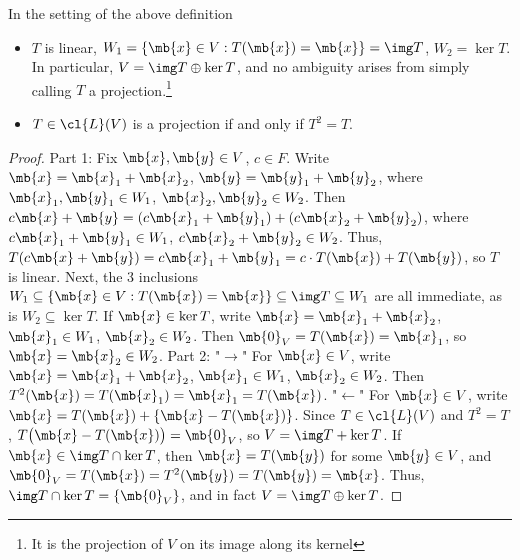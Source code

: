 \begin{exer}\label{e:projection}
In the setting of the above definition
\begin{itemize}
\item $T$ is linear, $W_1= \{ \mb{x}\in V:T( \mb{x})= \mb{x}\} = \img T$, $W_2= \ker T$. In particular, $V= \img T \oplus \ker T$, and no ambiguity arises from simply calling $T$ a projection.\footnote{It is the projection of $V$ on its image along its kernel}
\item $T \in \cl{L}(V)$ is a projection if and only if $T^2=T$.
\end{itemize}
\end{exer}
\begin{proof}%
Part 1: Fix $\mb{x}, \mb{y}\in V$, $c \in F$. Write $\mb{x}= \mb{x}_1+ \mb{x}_2$, $\mb{y}= \mb{y}_1+ \mb{y}_2$, where $\mb{x}_1, \mb{y}_1 \in W_1$, $\mb{x}_2, \mb{y}_2 \in W_2$.
Then $c \mb{x}+ \mb{y}=(c \mb{x}_1+ \mb{y}_1)+(c \mb{x}_2+ \mb{y}_2)$, where $c \mb{x}_1+ \mb{y}_1 \in W_1$, $c \mb{x}_2+ \mb{y}_2 \in W_2$.
Thus, $T(c \mb{x}+ \mb{y})=c \mb{x}_1+ \mb{y}_1= c \cdot T( \mb{x})+T( \mb{y})$, so $T$ is linear.
Next, the 3 inclusions $W_1 \subseteq \{ \mb{x}\in V:T( \mb{x})= \mb{x}\} \subseteq \img T \subseteq W_1$ are all immediate, as is $W_2 \subseteq \ker T$.
If $\mb{x}\in \ker T$, write $\mb{x}= \mb{x}_1+ \mb{x}_2$, $\mb{x}_1 \in W_1$, $\mb{x}_2 \in W_2$. Then $\mb{0}_V=T( \mb{x})= \mb{x}_1$, so $\mb{x}= \mb{x}_2 \in W_2$.
Part 2: "$\to$" For $\mb{x}\in V$, write $\mb{x}= \mb{x}_1+ \mb{x}_2$, $\mb{x}_1 \in W_1$, $\mb{x}_2 \in W_2$. Then $T^2( \mb{x})=T( \mb{x}_1)= \mb{x}_1=T( \mb{x})$.
"$\leftarrow$" For $\mb{x}\in V$, write $\mb{x}=T( \mb{x})+ \{ \mb{x}-T( \mb{x})\}$. Since $T \in \cl{L}(V)$ and $T^2=T$, $T \big( \mb{x}-T( \mb{x}) \big)= \mb{0}_V$, so $V= \img T+ \ker T$.
If $\mb{x}\in \img T \cap \ker T$, then $\mb{x}=T( \mb{y})$ for some $\mb{y}\in V$, and $\mb{0}_V=T( \mb{x})=T^2( \mb{y})=T( \mb{y})= \mb{x}$. Thus, $\img T \cap \ker T= \{ \mb{0}_V \}$, and in fact $V= \img T \oplus \ker T$.
\end{proof}

